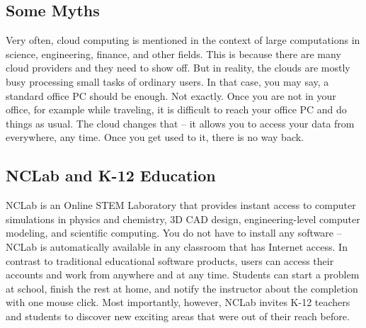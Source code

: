 \documentclass{article}
\begin{document}
\subsection{Some Myths}

Very often, cloud computing is mentioned in the context of large 
computations in science, engineering, finance, and other fields. This is because there are many 
cloud providers and they need to show off. But in reality, the clouds are mostly
busy processing small tasks of ordinary users. In that case, you may say, a standard 
office PC should be enough. Not exactly. Once you are not in your office, for example
while traveling, it is difficult to reach your office PC and do things as usual. 
The cloud changes that -- it allows you to access your data 
from everywhere, any time. Once you get used to it, there is no way back. 

\subsection{NCLab and K-12 Education}

NCLab is an Online STEM Laboratory that provides 
instant access to computer simulations in physics and chemistry, 3D CAD design, 
engineering-level computer modeling, and scientific computing. You do not have 
to install any software -- NCLab is automatically available in any classroom that 
has Internet access. In contrast to traditional educational software products, 
users can access their accounts and work from anywhere and at any time.
Students can start a problem at school, finish the rest at home, and notify 
the instructor about the completion with one mouse click. Most importantly, 
however, NCLab invites K-12 teachers and students to discover new exciting 
areas that were out of their reach before.
\end{document}
